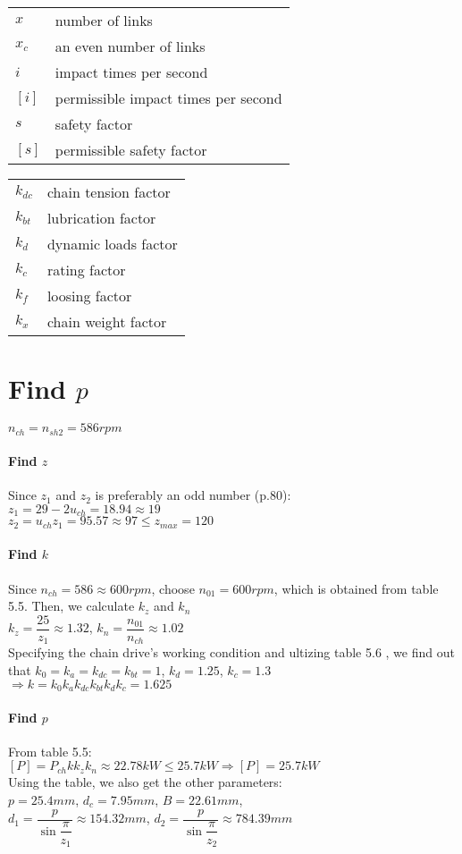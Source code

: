 \begin{tabular}[t]{lp{7cm}}
	$ x $ & number of links\\
	$ x_c $ & an even number of links\\
	$ i $ & impact times per second\\
	$ [i] $ & permissible impact times per second\\
	$ s $ & safety factor\\
	$ [s] $ & permissible safety factor\\
\end{tabular}
\begin{tabular}[t]{lp{7cm}}
	$ k_{dc} $ & chain tension  factor\\
	$ k_{bt} $ & lubrication factor\\
	$ k_d $ & dynamic loads factor\\
	$ k_c $ & rating factor\\
	$ k_f $ & loosing factor\\
	$ k_x $ & chain weight factor\\
\end{tabular}
\section{Find $ p $}
$ n_{ch} = n_{sh2} = 586\unit{rpm} $
\paragraph{Find $ z $}Since $ z_1 $ and $ z_2 $ is preferably an odd number (p.80):\\
$ z_1 = 29 - 2u_{ch} = 18.94 \approx 19$\\
$ z_2 = u_{ch}z_1 = 95.57 \approx 97 \leq z_{max} = 120$
\paragraph{Find $ k $}Since $ n_{ch} = 586 \approx 600 \unit{rpm}$, choose $ n_{01} = 600\unit{rpm} $, which is obtained from table 5.5. Then, we calculate $ k_z $ and $ k_n $\\
$ k_z = \dfrac{25}{z_1} \approx 1.32$, 
$ k_n = \dfrac{n_{01}}{n_{ch}} \approx 1.02$\\
Specifying the chain drive's working condition and ultizing table 5.6 , we find out that $ k_0=k_a=k_{dc}=k_{bt}=1 $, $ k_d=1.25 $, $ k_c=1.3 $\\
$\Rightarrow k = k_0k_ak_{dc}k_{bt}k_dk_c = 1.625$
\paragraph{Find $ p $} From table 5.5:\\
$ [P] = P_{ch}kk_zk_n \approx 22.78\unit{kW} \leq 25.7\unit{kW} \Rightarrow [P] = 25.7 \unit{kW}$\\
Using the table, we also get the other parameters:\\
$ p=25.4\unit{mm}$, $d_c=7.95\unit{mm}$, $ B=22.61\unit{mm}$,\\
$ d_1=\dfrac{p}{\sin{\dfrac{\pi}{z_1}}} \approx 154.32\unit{mm} $, 
$ d_2=\dfrac{p}{\sin{\dfrac{\pi}{z_2}}} \approx  784.39\unit{mm}$

